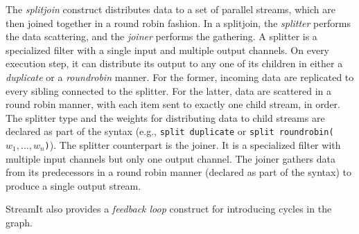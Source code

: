The {\it splitjoin} construct distributes data to a set of parallel
streams, which are then joined together in a round robin fashion.  In
a splitjoin, the {\it splitter} performs the data scattering, and the
{\it joiner} performs the gathering. A splitter is a specialized
filter with a single input and  multiple output channels. On 
every execution step, it can distribute its output to any one of
its children in either a {\it duplicate} or a {\it roundrobin}
manner. For the former, incoming data are replicated to every
sibling connected to the splitter. For the latter, data are scattered
in a round robin manner, with each item sent to exactly one child
stream, in order.  The splitter type and the weights for distributing data to
child streams are declared as part of the syntax (e.g., \texttt{split
duplicate} or \texttt{split roundrobin($w_1,\ldots,w_n$)}). The
splitter counterpart is the joiner. It is a specialized filter with  
multiple input channels but only one output channel. The joiner
gathers data from its predecessors in a round robin manner (declared
as part of the syntax) to produce a single output stream.

StreamIt also provides a {\it feedback loop} construct for introducing
cycles in the graph.


